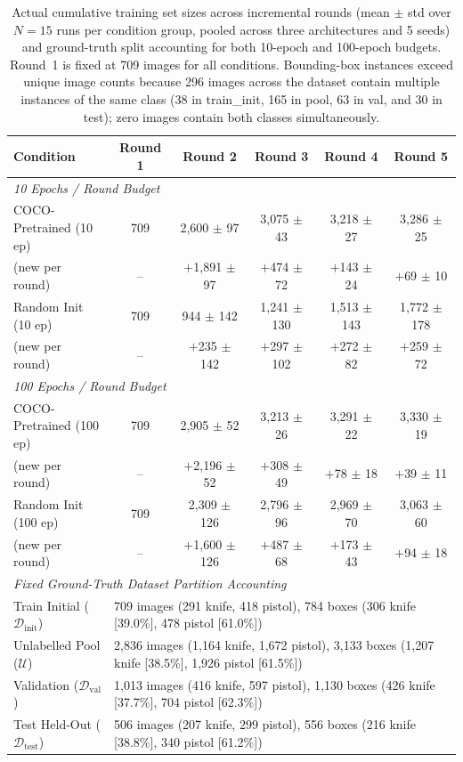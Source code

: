 \begin{table}[hbt!]
\caption{Actual cumulative training set sizes across incremental rounds (mean $\pm$ std over $N=15$ runs per condition group, pooled across three architectures and 5 seeds) and ground-truth split accounting for both 10-epoch and 100-epoch budgets. Round~1 is fixed at 709 images for all conditions. Bounding-box instances exceed unique image counts because 296 images across the dataset contain multiple instances of the same class (38 in train\_init, 165 in pool, 63 in val, and 30 in test); zero images contain both classes simultaneously.}%
\label{tab:supp_dataset}
\centering
\footnotesize
\setlength{\tabcolsep}{4pt}
\begin{tabular}{l c c c c c}
\toprule
\textbf{Condition} & \textbf{Round 1} & \textbf{Round 2} & \textbf{Round 3} & \textbf{Round 4} & \textbf{Round 5} \\
\midrule
\multicolumn{6}{l}{\textit{10 Epochs / Round Budget}} \\
COCO-Pretrained (10 ep) & 709 & 2,600 $\pm$ 97 & 3,075 $\pm$ 43 & 3,218 $\pm$ 27 & 3,286 $\pm$ 25 \\
(new per round) & {--} & $+$1,891 $\pm$ 97 & $+$474 $\pm$ 72 & $+$143 $\pm$ 24 & $+$69 $\pm$ 10 \\
Random Init (10 ep) & 709 & 944 $\pm$ 142 & 1,241 $\pm$ 130 & 1,513 $\pm$ 143 & 1,772 $\pm$ 178 \\
(new per round) & {--} & $+$235 $\pm$ 142 & $+$297 $\pm$ 102 & $+$272 $\pm$ 82 & $+$259 $\pm$ 72 \\
\midrule
\multicolumn{6}{l}{\textit{100 Epochs / Round Budget}} \\
COCO-Pretrained (100 ep) & 709 & 2,905 $\pm$ 52 & 3,213 $\pm$ 26 & 3,291 $\pm$ 22 & 3,330 $\pm$ 19 \\
(new per round) & {--} & $+$2,196 $\pm$ 52 & $+$308 $\pm$ 49 & $+$78 $\pm$ 18 & $+$39 $\pm$ 11 \\
Random Init (100 ep) & 709 & 2,309 $\pm$ 126 & 2,796 $\pm$ 96 & 2,969 $\pm$ 70 & 3,063 $\pm$ 60 \\
(new per round) & {--} & $+$1,600 $\pm$ 126 & $+$487 $\pm$ 68 & $+$173 $\pm$ 43 & $+$94 $\pm$ 18 \\
\midrule
\multicolumn{6}{l}{\textit{Fixed Ground-Truth Dataset Partition Accounting}} \\
Train Initial ($\mathcal{D}_{\text{init}}$) & \multicolumn{5}{l}{709 images (291 knife, 418 pistol), 784 boxes (306 knife [39.0\%], 478 pistol [61.0\%])} \\
Unlabelled Pool ($\mathcal{U}$) & \multicolumn{5}{l}{2,836 images (1,164 knife, 1,672 pistol), 3,133 boxes (1,207 knife [38.5\%], 1,926 pistol [61.5\%])} \\
Validation ($\mathcal{D}_{\text{val}}$) & \multicolumn{5}{l}{1,013 images (416 knife, 597 pistol), 1,130 boxes (426 knife [37.7\%], 704 pistol [62.3\%])} \\
Test Held-Out ($\mathcal{D}_{\text{test}}$) & \multicolumn{5}{l}{506 images (207 knife, 299 pistol), 556 boxes (216 knife [38.8\%], 340 pistol [61.2\%])} \\
\bottomrule
\end{tabular}
\end{table}
